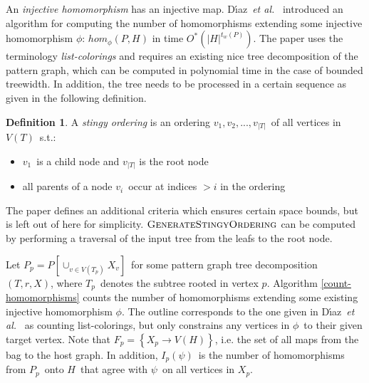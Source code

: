 \documentclass[a4paper,11pt]{report}
\theoremstyle{plain}
\theoremstyle{definition}
\newtheorem{defn}[thm]{Definition} %
\begin{document}
An \emph{injective homomorphism} has an injective map.
D{\'{\i}}az~{\em et al.}~\cite{DST02} introduced an algorithm for computing the number of homomorphisms extending some injective homomorphism $\phi$: $hom_{\phi}(P, H)$ in time $O^*(|H|^{t_w(P)})$.
The paper uses the terminology \emph{list-colorings} and requires an existing nice tree decomposition of the pattern graph, which can be computed in polynomial time in the case of bounded treewidth.
In addition, the tree needs to be processed in a certain sequence as given in the following definition.

\begin{defn}
A \emph{stingy ordering} is an ordering $v_1, v_2, ..., v_{|T|}$ of all vertices in $V(T)$ s.t.:
\begin{itemize}
\item $v_1$ is a child node and $v_{|T|}$ is the root node
\item all parents of a node $v_i$ occur at indices $>i$ in the ordering
\end{itemize}
\end{defn}

The paper defines an additional criteria which ensures certain space bounds, but is left out of here for simplicity.
$\textsc{GenerateStingyOrdering}$ can be computed by performing a traversal of the input tree from the leafs to the root node.

Let $P_p = P[\cup_{v \in V(T_p)} X_v]$ for some pattern graph tree decomposition $(T, r, X)$, where $T_p$ denotes the subtree rooted in vertex $p$.
Algorithm \ref{count-homomorphisms} counts the number of homomorphisms extending some existing injective homomorphism $\phi$.
The outline corresponds to the one given in D{\'{\i}}az~{\em et al.}~\cite{DST02} as counting list-colorings, but only constrains any vertices in $\phi$ to their given target vertex.
Note that $F_p = \left\{X_p \rightarrow V(H)\right\}$, i.e. the set of all maps from the bag to the host graph.
In addition, $I_p(\psi)$ is the number of homomorphisms from $P_p$ onto $H$ that agree with $\psi$ on all vertices in $X_p$.
\end{document}

